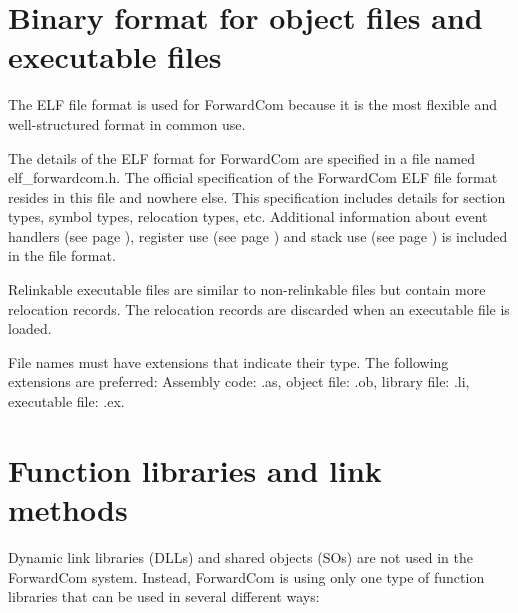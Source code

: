 \documentclass[forwardcom.tex]{subfiles}
\begin{document}
\RaggedRight

\section{Binary format for object files and executable files} \label{objectFileFormat}
The ELF file format is used for ForwardCom because it is the most flexible and well-structured format in common use.
\vv

The details of the ELF format for ForwardCom are specified in a file named elf\_forwardcom.h. The official specification of the ForwardCom ELF file format resides in this file and nowhere else. 
This specification includes details for section types, symbol types, relocation types, etc. Additional information about event handlers (see page \pageref{EventHandlers}), register use (see page \pageref{chap:registerUsageConvention}) and stack use (see page \pageref{predictingStackSize}) is included in the file format. 
\vv

Relinkable executable files are similar to non-relinkable files but contain more relocation records. The relocation records are discarded when an executable file is loaded.
\vv

File names must have extensions that indicate their type. The following extensions are preferred:  Assembly code: .as, object file: .ob, library file: .li, executable file: .ex. 
\vv

\section{Function libraries and link methods} \label{libraryLinkMethods}
Dynamic link libraries (DLLs) and shared objects (SOs) are not used in the ForwardCom system. Instead, ForwardCom is using only one type of function libraries that can be used in several different ways: 
\end{document}
